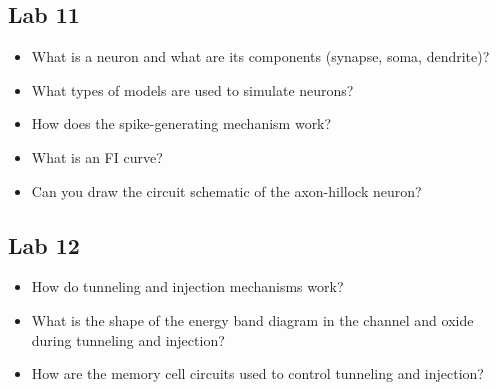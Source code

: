 \documentclass[report]{subfiles}
\begin{document}
\subsection{Lab 11}
\begin{itemize}
\item What is a neuron and what are its components (synapse, soma, dendrite)? \item What types of
models are used to simulate neurons? \item How does the spike-generating mechanism work?
\item What is an FI curve? \item Can you draw the circuit schematic of the axon-hillock neuron?
\end{itemize}


\subsection{Lab 12}
\begin{itemize}
\item How do tunneling and injection mechanisms work? \item What is the shape of the energy band
diagram in the channel and oxide during tunneling and injection? \item How are the memory cell
circuits used to control tunneling and injection?
\end{itemize}
\end{document}
